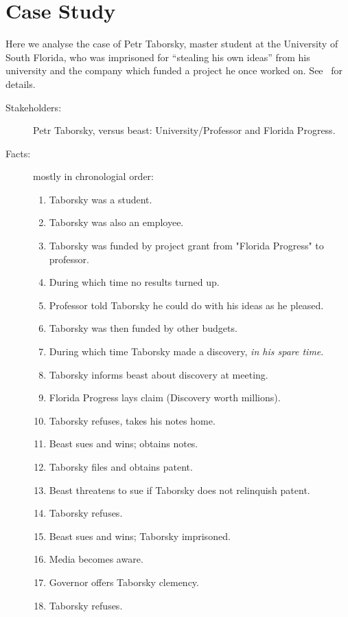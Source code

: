 \documentclass[draft,11pt,openright,monochrome,british,a4paper]{scrartcl}
\begin{document}
\section{Case Study}
Here we analyse the case of Petr Taborsky, master student at the
University of South Florida, who was imprisoned for ``stealing his own
ideas'' from his university and the company which funded a project he
once worked on. See~\cite{jaroff1997} for details.
\begin{description}
\item[Stakeholders:]Petr Taborsky, versus beast: University/Professor and Florida Progress.
\item[Facts:]mostly in chronologial order:
  \begin{enumerate}
    \item Taborsky was a student.
    \item Taborsky was also an employee.\label{facts:employee}
    \item Taborsky was funded by project grant from "Florida Progress" to professor.\label{facts:funding}
    \item During which time no results turned up.
    \item Professor told Taborsky he could do with his ideas as he pleased.\label{facts:permission}
    \item Taborsky was then funded by other budgets.
    \item During which time Taborsky made a discovery, \emph{in his spare time}.
    \item Taborsky informs beast about discovery at meeting.\label{fact:inform}
    \item Florida Progress lays claim (Discovery worth millions).
    \item Taborsky refuses, takes his notes home.\label{fact:refuses}
    \item Beast sues and wins; obtains notes.
    \item Taborsky files and obtains patent.
    \item Beast threatens to sue if Taborsky does not relinquish patent.
    \item Taborsky refuses.
    \item Beast sues and wins; Taborsky imprisoned.\label{facts:imprisoned}
    \item Media becomes aware.
    \item Governor offers Taborsky clemency.
    \item Taborsky refuses.
    \end{enumerate}

\end{description}
\end{document}
